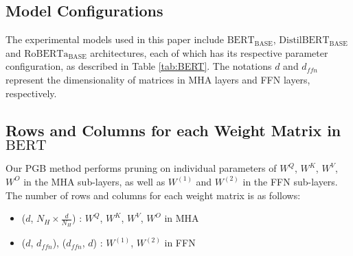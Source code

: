 \subsection{Model Configurations}

The experimental models used in this paper include $\text{BERT}_{\text{BASE}}$, $\text{DistilBERT}_{\text{BASE}}$ and $\text{RoBERTa}_{\text{BASE}}$ architectures, each of which has its respective parameter configuration, as described in Table \ref{tab:BERT}. The notations $d$ and $d_{ffn}$ represent the dimensionality of matrices in MHA layers and FFN layers, respectively.

\subsection{Rows and Columns for each Weight Matrix in $\text{BERT}$} 

Our PGB method performs pruning on individual parameters of $W^{Q}$, $W^{K}$, $W^{V}$, $W^{O}$ in the MHA sub-layers, as well as $W^{(1)}$ and $W^{(2)}$ in the FFN sub-layers. The number of rows and columns for each weight matrix is as follows:
\begin{itemize}
    \item ($d$, $N_{H}\times \frac{d}{N_{H}}$) : $W^{Q}$, $W^{K}$, $W^{V}$, $W^{O}$ in MHA
    \item ($d$, $d_{ffn}$), ($d_{ffn}$,\; $d$) : $W^{(1)}$, $
    W^{(2)}$ in FFN
\end{itemize}

